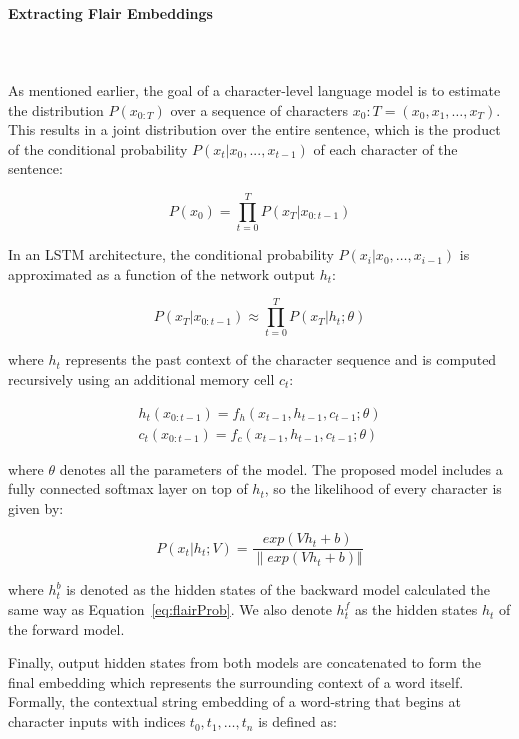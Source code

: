 \paragraph{Extracting Flair Embeddings}
\label{cap2:theoFrame/infExtr/sequenceLabeling/contextualEmbeddings/flairEmbeddings}
\mbox{}\\
\mbox{}\\
As mentioned earlier, the goal of a character-level language model is to estimate the 
distribution $P(x_{0:T})$ over a sequence of characters $x_0:T =(x_0, x_1,\ldots, x_T)$. This 
results in a joint distribution over the entire sentence, which is the product of the 
conditional probability $P(x_t|x_0,..., x_{t-1})$ of each character of the sentence:

\begin{equation} \label{eq:flairProb}
    P(x_0) = \prod_{t=0}^{T} P(x_T|x_{0:t-1})
\end{equation}

In an LSTM architecture, the conditional probability $P(x_i|x_0,\ldots,x_{i-1})$ is approximated 
as a function of the network output $h_t$:

\[
    P(x_T|x_{0:t-1}) \approx \prod_{t=0}^{T} P(x_T|h_t;\theta)    
\]

\noindent where $h_t$ represents the past context of the character sequence and is computed recursively 
using an additional memory cell $c_t$:

\begin{align*}
    h_t(x_{0:t-1})=f_h(x_{t-1},h_{t-1},c_{t-1};\theta) \\
    c_t(x_{0:t-1})=f_c(x_{t-1},h_{t-1},c_{t-1};\theta)    
\end{align*}

\noindent where $\theta$ denotes all the parameters of the model. The proposed model includes a fully 
connected softmax layer on top of $h_t$, so the likelihood of every character is given by:

\[
    P(x_t|h_t;V) = \frac{exp(V h_t+b)}{\| exp(V h_t+b) \Vert }
\]

\noindent where $h_t^b$ is denoted as the hidden states of the backward model calculated the same way as 
Equation~\ref{eq:flairProb}. We also denote $h_t^f$ as the hidden states $h_t$ of the forward model. 

Finally, output hidden states from both models are concatenated to form the final embedding 
which represents the surrounding context of a word itself. Formally, the contextual string 
embedding of a word-string that begins at character inputs with indices $t_0,t_1,\ldots,t_n$ 
is defined as:

